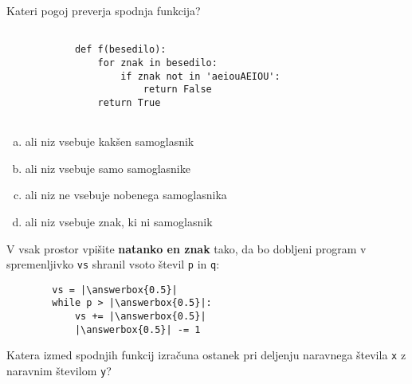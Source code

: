 \documentclass[arhiv, 10pt]{../izpit}
\newcommand{\inlinepy}[1]{\texttt{#1}}
\newcommand{\answerbox}[1]{\framebox{\vphantom{\large M}\hspace{#1cm}}}
\begin{document}
        \naloga*

        \begin{multicols}{2}
        \noindent
        Kateri pogoj preverja spodnja funkcija?
        \begin{verbatim}
        
            def f(besedilo):
                for znak in besedilo:
                    if znak not in 'aeiouAEIOU':
                        return False
                return True
            
        \end{verbatim}

        \begin{enumerate}[(a)]
\item ali niz vsebuje kakšen samoglasnik
\item ali niz vsebuje samo samoglasnike
\item ali niz ne vsebuje nobenega samoglasnika
\item ali niz vsebuje znak, ki ni samoglasnik
\end{enumerate}

        \end{multicols}
    
        \naloga*
        \begin{multicols}{2}
        \noindent
        V vsak prostor vpišite \textbf{natanko en znak} tako, da bo dobljeni program v spremenljivko \inlinepy{vs} shranil vsoto števil \inlinepy{p} in \inlinepy{q}:
        
        \columnbreak
        \begin{verbatim}
        vs = |\answerbox{0.5}|
        while p > |\answerbox{0.5}|:
            vs += |\answerbox{0.5}|
            |\answerbox{0.5}| -= 1
        \end{verbatim}
        \end{multicols}
    
        \clearpage
        \naloga
        
        Katera izmed spodnjih funkcij izračuna ostanek pri deljenju naravnega števila \inlinepy{x} z naravnim številom \inlinepy{y}?
    
\end{document}
